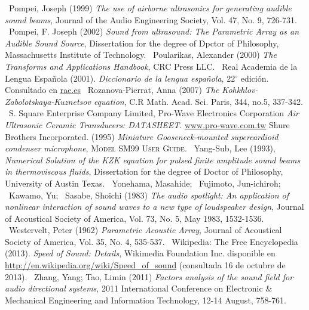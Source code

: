 \begin{thebibliography}{9999}
 ~Pompei, Joseph (1999)
\emph{The use of airborne ultrasonics for generating audible sound beams}, Journal of the Audio Engineering Society, Vol. 47, No. 9, 726-731.
 ~Pompei, F. Joseph (2002)
\emph{Sound from ultrasound: The Parametric Array as an Audible Sound Source}, Dissertation for the degree of Dpctor of Philosophy, Massachusetts Institute of Technology.
 ~Poularikas, Alexander (2000)
\emph{The Transforms and Applications Handbook}, CRC Press LLC.
 ~Real Academia de la Lengua Española (2001). \emph{Diccionario de la lengua española}, 22$^{\circ}$ edición. Consultado en \url{rae.es}
 ~Rozanova-Pierrat, Anna (2007)
\emph{The Kohkhlov-Zabolotskaya-Kuznetsov equation}, C.R Math. Acad. Sci. Paris, 344, no.5, 337-342.
~S. Square Enterprise Company Limited,  Pro-Wave Electronics Corporation 
\emph{Air Ultrasonic Ceramic Transducers: DATASHEET}. \url{www.pro-wave.com.tw}
 Shure Brothers Incorporated. (1995)
\emph{Miniature Gooseneck-mounted supercardioid condenser microphone}, \textsc{Model SM99 User Guide}.
 ~Yang-Sub, Lee (1993), 
\emph{Numerical Solution of the KZK equation for pulsed finite amplitude sound beams in thermoviscous fluids}, Dissertation for the degree of Doctor of Philosophy, University of Austin Texas.
 ~Yonehama, Masahide; ~Fujimoto, Jun-ichiroh; ~Kawamo, Yu; ~Sasabe, Shoichi (1983)
\emph{The audio spotlight: An application of nonlinear interaction of sound waves to a new type of loudspeaker design}, Journal of Acoustical Society of America, Vol. 73, No. 5, May 1983, 1532-1536.
 ~Westervelt, Peter (1962)
\emph{Parametric Acoustic Array}, Journal of Acoustical Society of America, Vol. 35, No. 4, 535-537.
 ~Wikipedia: The Free Encyclopedia (2013).
\emph{Speed of Sound: Details},  Wikimedia Foundation Inc. disponible en \url{http://en.wikipedia.org/wiki/Speed_of_sound} (consultada 16 de octubre de 2013).
 ~Zhang, Yang; Tao, Limin (2011)
\emph{Factors analysis of the sound field for audio directional systems}, 2011 International Conference on Electronic \& Mechanical Engineering and Information Technology, 12-14 August, 758-761.

\end{thebibliography}